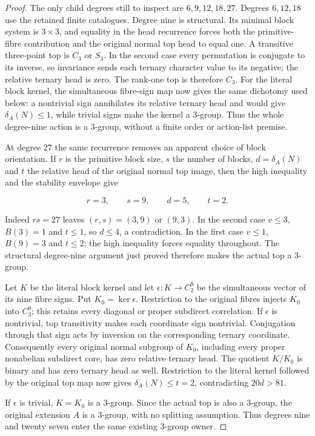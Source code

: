 \begin{proof}
The only child degrees still to inspect are $6,9,12,18,27$.
Degrees $6,12,18$ use the retained finite catalogues.  Degree nine is
structural.  Its minimal block system is $3\times3$, and equality in the
head recurrence forces both the primitive-fibre contribution and the
original normal top head to equal one.  A transitive three-point top is
$C_3$ or $S_3$.  In the second case every permutation is conjugate to its
inverse, so invariance sends each ternary character value to its negative;
the relative ternary head is zero.  The rank-one top is therefore $C_3$.
For the literal block kernel, the simultaneous fibre-sign map now gives the
same dichotomy used below: a nontrivial sign annihilates its relative
ternary head and would give $\delta_A(N)\leq1$, while trivial signs make the
kernel a $3$-group.  Thus the whole degree-nine action is a $3$-group,
without a finite order or action-list premise.

At degree 27 the same recurrence removes an apparent choice of block
orientation.  If $r$ is the primitive block size, $s$ the number of
blocks, $d=\delta_A(N)$ and $t$ the relative head of the original normal
top image, then the high inequality and the stability envelope give

\[
 r=3,\qquad s=9,\qquad d=5,\qquad t=2.
\]

Indeed $rs=27$ leaves $(r,s)=(3,9)$ or $(9,3)$.  In the second case
$v\leq3$, $B(3)=1$ and $t\leq1$, so $d\leq4$, a contradiction.
In the first case $v\leq1$, $B(9)=3$ and $t\leq2$; the high inequality
forces equality throughout.  The structural degree-nine argument just
proved therefore makes the actual top a $3$-group.

Let $K$ be the literal block kernel and let
$\epsilon:K\to C_2^9$ be the simultaneous vector of its nine fibre
signs.  Put $K_0=\ker\epsilon$.  Restriction to the original fibres
injects $K_0$ into $C_3^9$; this retains every diagonal or proper
subdirect correlation.  If $\epsilon$ is nontrivial, top transitivity
makes each coordinate sign nontrivial.  Conjugation through that sign
acts by inversion on the corresponding ternary coordinate.  Consequently
every original normal subgroup of $K_0$, including every proper
nonabelian subdirect core, has zero relative ternary head.  The quotient
$K/K_0$ is binary and has zero ternary head as well.  Restriction to the
literal kernel followed by the original top map now gives
$\delta_A(N)\leq t=2$, contradicting $20d>81$.

If $\epsilon$ is trivial, $K=K_0$ is a $3$-group.  Since the actual top
is also a $3$-group, the original extension $A$ is a $3$-group, with no
splitting assumption.  Thus degrees nine and twenty seven enter the same
existing $3$-group owner.


\end{proof}
